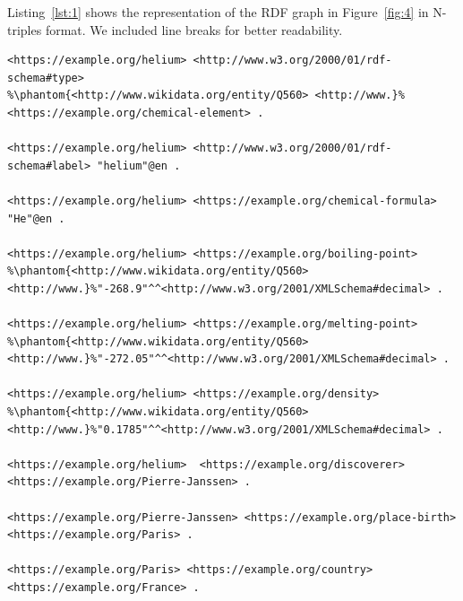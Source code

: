 Listing~\ref{lst:1} shows the representation of the RDF graph in Figure~\ref{fig:4} in N-triples format. We included line breaks for better readability.

\begin{minipage}{\linewidth}
\begin{lstlisting}[columns=fullflexible, label=lst:1, caption={RDF graph represented in N-triples syntax}, language=SPARQL]
<https://example.org/helium> <http://www.w3.org/2000/01/rdf-schema#type>
%\phantom{<http://www.wikidata.org/entity/Q560> <http://www.}%<https://example.org/chemical-element> .
		                                                
<https://example.org/helium> <http://www.w3.org/2000/01/rdf-schema#label> "helium"@en .

<https://example.org/helium> <https://example.org/chemical-formula> "He"@en .

<https://example.org/helium> <https://example.org/boiling-point> 
%\phantom{<http://www.wikidata.org/entity/Q560> <http://www.}%"-268.9"^^<http://www.w3.org/2001/XMLSchema#decimal> .

<https://example.org/helium> <https://example.org/melting-point> 
%\phantom{<http://www.wikidata.org/entity/Q560> <http://www.}%"-272.05"^^<http://www.w3.org/2001/XMLSchema#decimal> .

<https://example.org/helium> <https://example.org/density> 
%\phantom{<http://www.wikidata.org/entity/Q560> <http://www.}%"0.1785"^^<http://www.w3.org/2001/XMLSchema#decimal> .

<https://example.org/helium>  <https://example.org/discoverer> <https://example.org/Pierre-Janssen> .

<https://example.org/Pierre-Janssen> <https://example.org/place-birth> <https://example.org/Paris> .

<https://example.org/Paris> <https://example.org/country> <https://example.org/France> .
\end{lstlisting}
\end{minipage}


